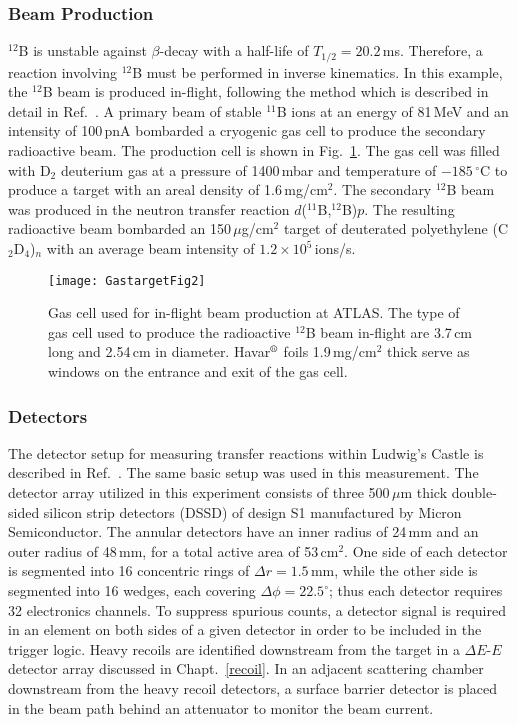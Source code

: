 \subsubsection{Beam Production}
\label{beamprod}
$^{12}$B is unstable against $\beta$-decay with a half-life of $T_{1/2}=20.2$\,ms.  Therefore, a reaction involving $^{12}$B must be performed in inverse kinematics.  In this example, the $^{12}$B beam is produced in-flight, following the method %
which is described in detail in Ref.~\cite{Harss_2000}.  A primary beam of stable $^{11}$B ions at an energy of 81\,MeV and an intensity of 100\,pnA bombarded a cryogenic gas cell to produce the secondary radioactive beam. %
The production cell is shown in Fig.~\ref{gas_cell}.  The gas cell was filled with D$_2$ deuterium gas at a pressure of 1400\,mbar and temperature of $-185$\,$^\circ$C to produce a target with an areal density of 1.6\,mg/cm$^2$.  The secondary $^{12}$B beam was produced in the neutron transfer reaction $d$($^{11}$B,$^{12}$B)$p$.  The resulting radioactive beam bombarded an 150\,$\mu$g/cm$^2$ target of deuterated polyethylene (C$_2$D$_4$)$_n$ with an average beam intensity of $1.2\times 10^5$\,ions/s.

\begin{figure}%
\centering
\texttt{[image: GastargetFig2]}%
\caption[Gas cell used for in-flight beam production at ATLAS]{Gas cell used for in-flight beam production at ATLAS.  The type of gas cell used to produce the radioactive $^{12}$B beam in-flight are 3.7\,cm long and 2.54\,cm in diameter. Havar$\textsuperscript{\textregistered}$ foils 1.9\,mg/cm$^2$ thick serve as windows on the entrance and exit of the gas cell.}
\label{gas_cell}%
\end{figure}

\subsubsection{Detectors}
The  detector setup for measuring transfer reactions within Ludwig's Castle is described in Ref.~\cite{Wuosmaa_2005}.  The same basic setup was used in this measurement.  The detector array utilized in this experiment consists of three 500\,$\mu$m thick double-sided silicon strip detectors (DSSD) of design S1 manufactured by Micron Semiconductor.  The annular detectors have an inner radius of 24\,mm and an outer radius of 48\,mm, for a total active area of 53\,cm$^2$.  One side of each detector is segmented into 16 concentric rings of $\Delta r=1.5$\,mm, while the other side is segmented into 16 wedges, each covering $\Delta \phi =22.5^\circ$; thus each detector requires 32 electronics channels.  To suppress spurious counts, a detector signal is required in an element on both sides of a given detector in order to be included in the trigger logic.  Heavy recoils are identified downstream from the target in a $\Delta E$-$E$ detector array discussed in Chapt.~\ref{recoil}.  In an adjacent scattering chamber downstream from the heavy recoil detectors, a surface barrier detector is placed in the beam path behind an %
 attenuator to monitor the beam current.

